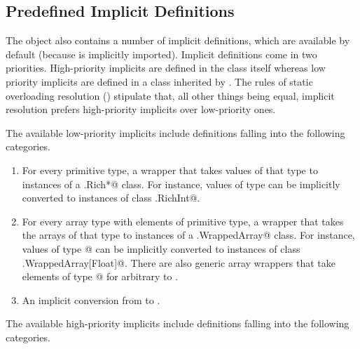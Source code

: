 \subsection{Predefined Implicit Definitions}

The \lstinline@Predef@ object also contains a number of implicit definitions, which are available by default (because \lstinline@Predef@ is implicitly imported).
Implicit definitions come in two priorities. High-priority implicits are defined in the \lstinline@Predef@ class itself whereas low priority implicits are defined in a class inherited by \lstinline@Predef@. The rules of 
static overloading resolution ()
stipulate that, all other things being equal, implicit resolution 
prefers high-priority implicits over low-priority ones.

The available low-priority implicits include definitions falling into the following categories.

\begin{enumerate}
\item
For every primitive type, a wrapper that takes values of that type
to instances of a \lstinline@runtime.Rich*@ class. For instance, values of type \lstinline@Int@
can be implicitly converted to instances of class \lstinline@runtime.RichInt@.
\item
For every array type with elements of primitive type, a wrapper that
takes the arrays of that type to instances of a \lstinline@runtime.WrappedArray@ class. For instance, values of type \lstinline@Array[Float]@ can be implicitly converted to instances of class \lstinline@runtime.WrappedArray[Float]@.
There are also generic array wrappers that take elements
of type \lstinline@Array[T]@ for arbitrary \lstinline@T@ to \lstinline@WrappedArray@s.
\item
An implicit conversion from \lstinline@String@ to \lstinline@WrappedString@.
\end{enumerate}

The available high-priority implicits include definitions falling into the following categories.

